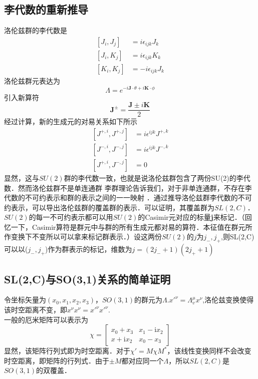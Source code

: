 \subsection{李代数的重新推导}
洛伦兹群的李代数是
\begin{equation}
\begin{aligned}
\left[J_{i}, J_{j}\right] &=i \epsilon_{i j k} J_{k} \\
\left[J_{i}, K_{j}\right] &=i \epsilon_{i j k} K_{k} \\
\left[K_{i}, K_{j}\right] &=-i \epsilon_{i j k} J_{k}
\end{aligned}
\end{equation}
洛伦兹群元表达为
\begin{equation}\label{qed3_eq1}
\Lambda=e^{-i \mathbf{J} \cdot \theta+i \mathbf{K} \cdot \phi}
\end{equation}
引入新算符
\begin{equation}
\mathbf{J}^{\pm}=\frac{\mathbf{J} \pm i \mathbf{K}}{2}
\end{equation}
经过计算，新的生成元的对易关系如下所示
\begin{equation}
\begin{aligned}
\left[J^{+, i}, J^{+, j}\right] &=i \epsilon^{i j k} J^{+, k} \\
\left[J^{-, i}, J^{-, j}\right] &=i \epsilon^{i j k} J^{-, k} \\
\left[J^{+, i}, J^{-, j}\right] &=0
\end{aligned}
\end{equation}
显然，这与$SU(2)$群的李代数一致，也就是说洛伦兹群包含了两份SU(2)的李代数．然而洛伦兹群不是单连通群 李群理论告诉我们，对于非单连通群，不存在李代数的不可约表示和群的表示之间的一一映射 ．通过推导洛伦兹群李代数的不可约表示，可以导出洛伦兹群的覆盖群的表示．可以证明，其覆盖群为$SL(2,C)$．$SU(2)$的每一不可约表示都可以用$SU(2)$的Casimir元对应的标量\textbf{j}来标记．（回忆一下，Casimir算符是群元中与群的所有生成元都对易的算符．本征值在群元所作变换下不变所以可以拿来标记群表示．）设这两份$SU(2)$的$j$为$j_-,j_+$,则SL(2,C)可以以($j_-,j_+$)作为群表示的标记，维数为$j=(2j_-+1)(2j_++1)$
\subsection{SL(2,C)与SO(3,1)关系的简单证明}
令坐标矢量为$(x_0,x_1,x_2,x_3)$，$SO(3,1)$的群元为$\Lambda$.$x'^{\nu}=\Lambda_{v}^{\mu} x^{\nu}$,洛伦兹变换使得该时空距离不变，即$x^\nu x^\nu=x'^\nu x'^\nu$.
\\一般的厄米矩阵可以表示为
\begin{equation}
\chi=\left[\begin{array}{cc}
x_0+x_3 & x_1-\mathrm{i} x_2 \\
x+\mathrm{i}x_2 & x_0-x_3
\end{array}\right]
\end{equation}
显然，该矩阵行列式即为时空距离．对于$\chi'=M \chi M^{*}$，该线性变换同样不会改变时空距离，即矩阵的行列式．由于$\pm M$都对应同一个$\Lambda$，所以$SL(2,C)$是$SO(3,1)$的双覆盖．
